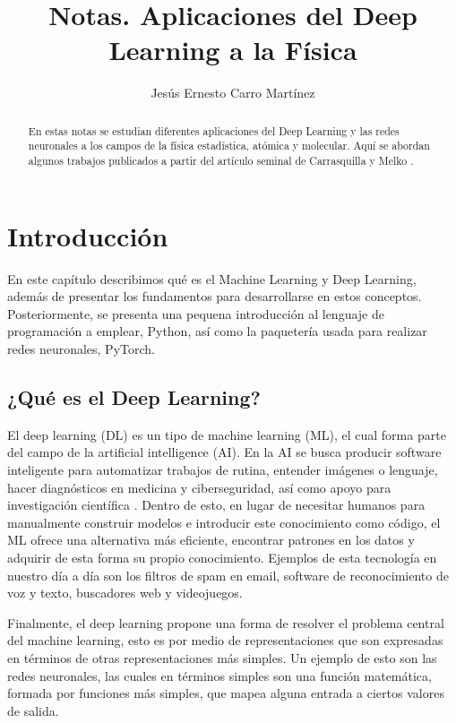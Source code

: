 \documentclass[12pt,oneside,openany]{memoir}
\title{Notas. Aplicaciones del Deep Learning a la Física}
\author{Jesús Ernesto Carro Martínez}
\begin{document}
\maketitle

\begin{abstract}
En estas notas se estudian diferentes aplicaciones del Deep Learning y las redes neuronales a los campos de la física estadística, atómica y molecular. Aquí se abordan algunos trabajos publicados a partir del artículo seminal de Carrasquilla y Melko \cite{Car17}.
\end{abstract}

\newpage

\chapter{Introducción}

En este capítulo describimos qué es el Machine Learning y Deep Learning, además de presentar los fundamentos para desarrollarse en estos conceptos. Posteriormente, se presenta una pequena introducción al lenguaje de programación a emplear, Python, así como la paquetería usada para realizar redes neuronales, PyTorch. 

\section{¿Qué es el Deep Learning?}

El deep learning (DL) es un tipo de machine learning (ML), el cual forma parte del campo de la artificial intelligence (AI). En la AI se busca producir software inteligente para automatizar trabajos de rutina, entender imágenes o lenguaje, hacer diagnósticos en medicina y ciberseguridad, así como apoyo para investigación científica \cite{Nil09}. Dentro de esto, en lugar de necesitar humanos para manualmente construir modelos e introducir este conocimiento como código, el ML ofrece una alternativa más eficiente, encontrar patrones en los datos y adquirir de esta forma su propio conocimiento. Ejemplos de esta tecnología en nuestro día a día son los filtros de spam en email, software de reconocimiento de voz y texto, buscadores web y videojuegos.

Finalmente, el deep learning propone una forma de resolver el problema central del machine learning, esto es por medio de representaciones que son expresadas en términos de otras representaciones más simples. Un ejemplo de esto son las redes neuronales, las cuales en términos simples son una función matemática, formada por funciones más simples, que mapea alguna entrada a ciertos valores de salida. 
\end{document}
